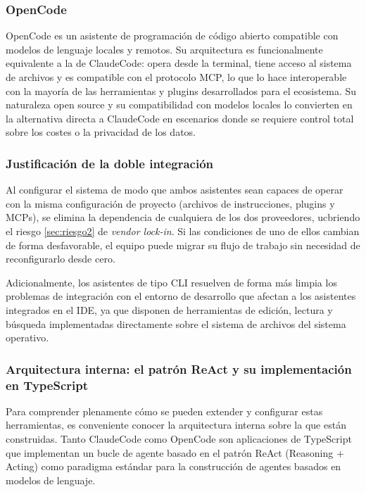 \documentclass[11pt, letterpaper]{article}
\begin{document}
\subsubsection{OpenCode}
\label{sec:opencode}
OpenCode \cite{opencode_2025} es un asistente de programación de código abierto compatible con modelos de lenguaje locales y remotos. Su arquitectura es funcionalmente equivalente a la de ClaudeCode: opera desde la terminal, tiene acceso al sistema de archivos y es compatible con el protocolo MCP, lo que lo hace interoperable con la mayoría de las herramientas y plugins desarrollados para el ecosistema. Su naturaleza open source y su compatibilidad con modelos locales lo convierten en la alternativa directa a ClaudeCode en escenarios donde se requiere control total sobre los costes o la privacidad de los datos.

\subsubsection{Justificación de la doble integración}
\label{sec:justificacion_doble_integracion}
Al configurar el sistema de modo que ambos asistentes sean capaces de operar con la misma configuración de proyecto (archivos de instrucciones, plugins y MCPs), se elimina la dependencia de cualquiera de los dos proveedores, ucbriendo el riesgo \ref{sec:riesgo2} de \textit{vendor lock-in}. Si las condiciones de uno de ellos cambian de forma desfavorable, el equipo puede migrar su flujo de trabajo sin necesidad de reconfigurarlo desde cero.

Adicionalmente, los asistentes de tipo CLI resuelven de forma más limpia los problemas de integración con el entorno de desarrollo que afectan a los asistentes integrados en el IDE, ya que disponen de herramientas de edición, lectura y búsqueda implementadas directamente sobre el sistema de archivos del sistema operativo.

\subsubsection{Arquitectura interna: el patrón ReAct y su implementación en TypeScript}
\label{sec:react_pattern}
Para comprender plenamente cómo se pueden extender y configurar estas herramientas, es conveniente conocer la arquitectura interna sobre la que están construidas. Tanto ClaudeCode como OpenCode son aplicaciones de TypeScript que implementan un bucle de agente basado en el patrón ReAct (Reasoning + Acting) \cite{yao_react_2023} como paradigma estándar para la construcción de agentes basados en modelos de lenguaje.
\end{document}
